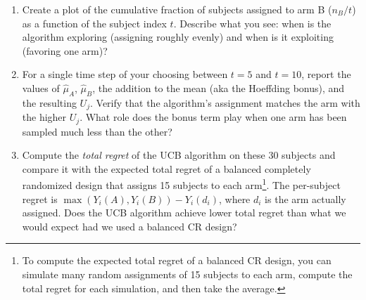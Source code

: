 \documentclass[
  letterpaper,
  DIV=11,
  numbers=noendperiod]{scrartcl}
\begin{document}
\begin{enumerate}
  \begin{enumerate}
  \def\labelenumii{\alph{enumii}.}
  \setcounter{enumii}{1}
  \item
    Create a plot of the cumulative fraction of subjects assigned to arm
    B (\(n_B / t\)) as a function of the subject index \(t\). Describe
    what you see: when is the algorithm exploring (assigning roughly
    evenly) and when is it exploiting (favoring one arm)?
  \item
    For a single time step of your choosing between \(t = 5\) and
    \(t = 10\), report the values of \(\hat{\mu}_A\), \(\hat{\mu}_B\),
    the addition to the mean (aka the Hoeffding bonus), and the
    resulting \(U_j\). Verify that the algorithm's assignment matches
    the arm with the higher \(U_j\). What role does the bonus term play
    when one arm has been sampled much less than the other?
  \item
    Compute the \emph{total regret} of the UCB algorithm on these 30
    subjects and compare it with the expected total regret of a balanced
    completely randomized design that assigns 15 subjects to each
    arm\footnote{To compute the expected total regret of a balanced CR
      design, you can simulate many random assignments of 15 subjects to
      each arm, compute the total regret for each simulation, and then
      take the average.}. The per-subject regret is
    \(\max(Y_i(A), Y_i(B)) - Y_i(d_i)\), where \(d_i\) is the arm
    actually assigned. Does the UCB algorithm achieve lower total regret
    than what we would expect had we used a balanced CR design?
  \end{enumerate}
\end{enumerate}
\end{document}
